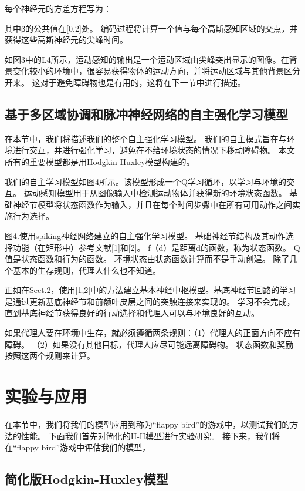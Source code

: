 \documentclass[a4paper,12pt]{ctexart}
\begin{document}
每个神经元的方差方程写为：

其中β的公共值在[0,2]处。 编码过程将计算一个值与每个高斯感知区域的交点，并获得这些高斯神经元的尖峰时间。

如图3中的L4所示，运动感知的输出是一个运动区域由尖峰突出显示的图像。在背景变化较小的环境中，很容易获得物体的运动方向，并将运动区域与其他背景区分开来。 这对于避免障碍物也是有用的，这将在下一节中进行描述。

\subsection{基于多区域协调和脉冲神经网络的自主强化学习模型}

在本节中，我们将描述我们的整个自主强化学习模型。 我们的自主模式旨在与环境进行交互，并进行强化学习，避免在不给环境状态的情况下移动障碍物。 本文所有的重要模型都是用Hodgkin-Huxley模型构建的。

我们的自主学习模型如图4所示。该模型形成一个Q学习循环，以学习与环境的交互。 运动感知模型用于从图像输入中检测运动物体并获得新的环境状态函数。 基础神经节模型将状态函数作为输入，并且在每个时间步骤中在所有可用动作之间实施行为选择。

图4.使用spiking神经网络建立的自主强化学习模型。 基础神经节结构及其动作选择功能（在矩形中）参考文献[1]和[2]。 f（d）是距离d的函数，称为状态函数。 Q值是状态函数和行为的函数。 环境状态由状态函数计算而不是手动创建。 除了几个基本的生存规则，代理人什么也不知道。

正如在Sect.2，使用[1,2]中的方法建立基本神经中枢模型。基底神经节回路的学习是通过更新基底神经节和前额叶皮层之间的突触连接来实现的。 学习不会完成，直到基底神经节获得良好的行动选择和代理人可以与环境良好的互动。

如果代理人要在环境中生存，就必须遵循两条规则：（1）代理人的正面方向不应有障碍。 （2）如果没有其他目标，代理人应尽可能远离障碍物。 状态函数和奖励按照这两个规则来计算。

\section{实验与应用}
在本节中，我们将我们的模型应用到称为“flappy bird”的游戏中，以测试我们的方法的性能。 下面我们首先对简化的H-H模型进行实验研究。 接下来，我们将在“flappy bird”游戏中评估我们的模型，

\subsection{简化版Hodgkin-Huxley模型}
\end{document}
